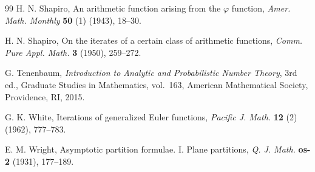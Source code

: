 \documentclass[11pt]{article}
\theoremstyle{definition}
\begin{document}
\begin{thebibliography}{99}
 H. N. Shapiro, An arithmetic function arising from the $\varphi$ function, {\it Amer. Math. Monthly} {\bf 50} (1) (1943), 18--30.

 H. N. Shapiro, On the iterates of a certain class of arithmetic functions, {\it Comm. Pure Appl. Math.} {\bf 3} (1950), 259--272.

 G. Tenenbaum, {\it Introduction to Analytic and Probabilistic Number Theory}, 3rd ed., Graduate Studies in Mathematics, vol.~163, American Mathematical Society, Providence, RI, 2015.

 G. K. White, Iterations of generalized Euler functions, {\it Pacific J. Math.} {\bf 12} (2) (1962), 777--783.

 E. M. Wright, Asymptotic partition formulae. I. Plane partitions, {\it Q. J. Math.} {\bf os-2} (1931), 177--189.

\end{thebibliography}
\end{document}
